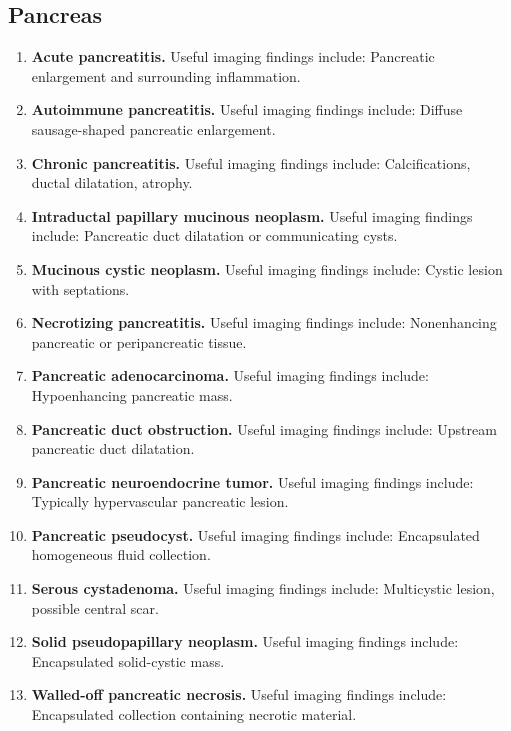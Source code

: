 \subsection{Pancreas}
\begin{enumerate}[leftmargin=*,itemsep=0.45em,topsep=0.4em]
\item \textbf{Acute pancreatitis.} Useful imaging findings include: Pancreatic enlargement and surrounding inflammation.
\item \textbf{Autoimmune pancreatitis.} Useful imaging findings include: Diffuse sausage-shaped pancreatic enlargement.
\item \textbf{Chronic pancreatitis.} Useful imaging findings include: Calcifications, ductal dilatation, atrophy.
\item \textbf{Intraductal papillary mucinous neoplasm.} Useful imaging findings include: Pancreatic duct dilatation or communicating cysts.
\item \textbf{Mucinous cystic neoplasm.} Useful imaging findings include: Cystic lesion with septations.
\item \textbf{Necrotizing pancreatitis.} Useful imaging findings include: Nonenhancing pancreatic or peripancreatic tissue.
\item \textbf{Pancreatic adenocarcinoma.} Useful imaging findings include: Hypoenhancing pancreatic mass.
\item \textbf{Pancreatic duct obstruction.} Useful imaging findings include: Upstream pancreatic duct dilatation.
\item \textbf{Pancreatic neuroendocrine tumor.} Useful imaging findings include: Typically hypervascular pancreatic lesion.
\item \textbf{Pancreatic pseudocyst.} Useful imaging findings include: Encapsulated homogeneous fluid collection.
\item \textbf{Serous cystadenoma.} Useful imaging findings include: Multicystic lesion, possible central scar.
\item \textbf{Solid pseudopapillary neoplasm.} Useful imaging findings include: Encapsulated solid-cystic mass.
\item \textbf{Walled-off pancreatic necrosis.} Useful imaging findings include: Encapsulated collection containing necrotic material.
\end{enumerate}

